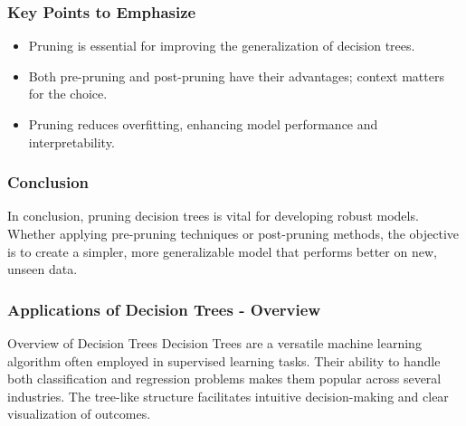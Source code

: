 \documentclass[aspectratio=169]{beamer}
\begin{document}
\begin{frame}[fragile]
    \frametitle{Key Points to Emphasize}
    \begin{itemize}
        \item Pruning is essential for improving the generalization of decision trees.
        \item Both pre-pruning and post-pruning have their advantages; context matters for the choice.
        \item Pruning reduces overfitting, enhancing model performance and interpretability.
    \end{itemize}
\end{frame}

\begin{frame}[fragile]
    \frametitle{Conclusion}
    In conclusion, pruning decision trees is vital for developing robust models. Whether applying pre-pruning techniques or post-pruning methods, the objective is to create a simpler, more generalizable model that performs better on new, unseen data.
\end{frame}

\begin{frame}[fragile]
    \frametitle{Applications of Decision Trees - Overview}
    \begin{block}{Overview of Decision Trees}
        Decision Trees are a versatile machine learning algorithm often employed in supervised learning tasks. Their ability to handle both classification and regression problems makes them popular across several industries. The tree-like structure facilitates intuitive decision-making and clear visualization of outcomes.
    \end{block}
\end{frame}
\end{document}
